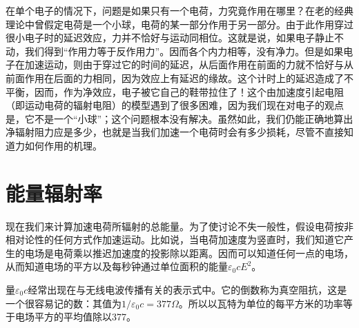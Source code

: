 在单个电子的情况下，问题是如果只有一个电荷，力究竟作用在哪里？在老的经典理论中曾假定电荷是一个小球，电荷的某一部分作用于另一部分。由于此作用穿过很小电子时的延迟效应，力并不恰好与运动同相位。这就是说，如果电子静止不动，我们得到“作用力等于反作用力”。因而各个内力相等，没有净力。但是如果电子在加速运动，则由于穿过它的时间的延迟，从后面作用在前面的力就不恰好与从前面作用在后面的力相同，因为效应上有延迟的缘故。这个计时上的延迟造成了不平衡，因而，作为净效应，电子被它自己的鞋带拉住了！这个由加速度引起电阻（即运动电荷的辐射电阻）的模型遇到了很多困难，因为我们现在对电子的观点是，它不是一个“小球”；这个问题根本没有解决。虽然如此，我们仍能正确地算出净辐射阻力应是多少，也就是当我们加速一个电荷时会有多少损耗，尽管不直接知道力如何作用的机理。

\section{能量辐射率}

现在我们来计算加速电荷所辐射的总能量。为了使讨论不失一般性，假设电荷按非相对论性的任何方式作加速运动。比如说，当电荷加速度为竖直时，我们知道它产生的电场是电荷乘以推迟加速度的投影除以距离。因而可以知道任何一点的电场，从而知道电场的平方以及每秒钟通过单位面积的能量$\varepsilon_0cE^2$。

量$\varepsilon_0c$经常出现在与无线电波传播有关的表示式中。它的倒数称为真空阻抗，这是一个很容易记的数：其值为$1/\varepsilon_0c=377 \Omega$。所以以瓦特为单位的每平方米的功率等于电场平方的平均值除以377。

